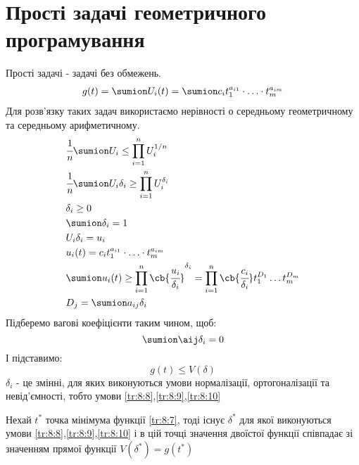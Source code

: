 \section{Прості задачі геометричного програмування}
Прості задачі - задачі без обмежень.
\begin{eqnarray}
g(t) = \sumion U_i(t) = \sumion c_i t_1^{a_{i1}} \cdot \ldots\cdot t_m^{a_{im}}\label{tr:8:7}
\end{eqnarray}
Для розв’язку таких задач використаємо нерівності о середньому геометричному та середньому арифметичному.\\
\begin{eqnarray}
&\cfrac1n \sumion U_i \leq \prod\limits_{i=1}^n U_i^{1/n}\\
&\cfrac1n \sumion U_i \delta_i \geq \prod\limits_{i=1}^n U_i^{\delta_i}\\
&\delta_i\geq 0\label{tr:8:8}\\
&\sumion \delta_i = 1\label{tr:8:9}\\
&U_i\delta_i = u_i \\
&u_i(t) = c_it_1^{a_{i1}}\cdot\ldots\cdot t_m^{a_{im}}\\
&\sumion u_i(t) \geq \prod\limits_{i=1}^n \cb{\cfrac{u_i}{\delta_i}}^{\delta_i} = \prod\limits_{i=1}^n \cb{\cfrac{c_i}{\delta_i}} t_1^{D_1}\ldots t_m^{D_m}\\
&D_j = \sumion a_{ij} \delta_i\\
\end{eqnarray}
Підберемо вагові коефіцієнти таким чином, щоб:
\begin{equation}\label{tr:8:10}
\sumion \aij \delta_i = 0
\end{equation}
І підставимо:
\begin{equation}
g(t) \leq V(\delta)
\end{equation}
$\delta_i$ - це змінні, для яких виконуються умови нормалізації, ортогоналізації та невід’ємності, тобто умови \eqref{tr:8:8},\eqref{tr:8:9},\eqref{tr:8:10}
\begin{teor}
Нехай $t^*$ точка мінімума функції \eqref{tr:8:7}, тоді існує $\delta^*$ для якої виконуються умови \eqref{tr:8:8},\eqref{tr:8:9},\eqref{tr:8:10} і в цій точці значення двоїстої функції співпадає зі значенням прямої функції $V(\delta^*) = g(t^*)$
\end{teor}
